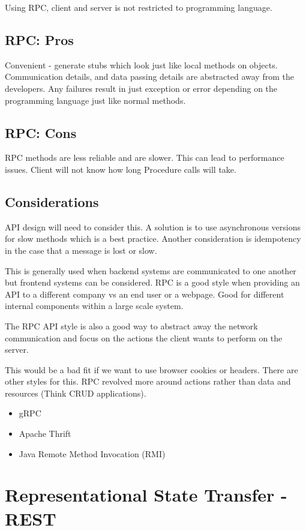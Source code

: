 Using RPC, client and server is not restricted to programming language.

\subsection{RPC: Pros}
Convenient - generate stubs which look just like local methods on objects.
Communication details, and data passing details are abstracted away from the developers.
Any failures result in just exception or error depending on the programming language just like normal methods.

\subsection{RPC: Cons}
RPC methods are less reliable and are slower.
This can lead to performance issues.
Client will not know how long Procedure calls will take.

\subsection{Considerations}
API design will need to consider this.
A solution is to use asynchronous versions for slow methods which is a best practice.
Another consideration is idempotency in the case that a message is lost or slow.

This is generally used when backend systems are communicated to one another but frontend systems can be considered.
RPC is a good style when providing an API to a different company vs an end user or a webpage.
Good for different internal components within a large scale system.

The RPC API style is also a good way to abstract away the network communication and focus on the actions the client wants to perform on the server.

This would be a bad fit if we want to use browser cookies or headers.
There are other styles for this.
RPC revolved more around actions rather than data and resources (Think CRUD applications).

\begin{itemize}
    \item gRPC
    \item Apache Thrift
    \item Java Remote Method Invocation (RMI)
\end{itemize}


\section{Representational State Transfer - REST}

